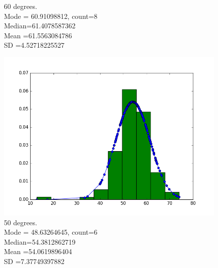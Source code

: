 \documentclass[12pt]{article}
\numberwithin{figure}{section}
\numberwithin{table}{section}
\begin{document}
\begin{figure}[H]
\begin{minipage}[b]{0.4\textwidth}
    \caption[Estimation at angle 60 degrees]{60 degrees.
     \\\hspace{\textwidth}Mode   = 60.91098812, count=8
	\\\hspace{\textwidth}	Median=61.4078587362
	\\\hspace{\textwidth}	Mean   =61.5563084786
	\\\hspace{\textwidth}	SD       =4.52718225527}
  \end{minipage}
\end{figure}
\begin{figure}[H]
  \centering
  \begin{minipage}[b]{0.4\textwidth}
    \includegraphics[width=\textwidth]{angle50.png}
    \caption[Estimation at angle 50 degrees]{50 degrees.
    \\\hspace{\textwidth}Mode   = 48.63264645, count=6
	\\\hspace{\textwidth}	Median=54.3812862719
	\\\hspace{\textwidth}	Mean   =54.0619896404
	\\\hspace{\textwidth}	SD       =7.37749397882}
  \end{minipage}
  \hfill
  \begin{minipage}[b]{0.4\textwidth}

\end{minipage}
\end{figure}
\end{document}
